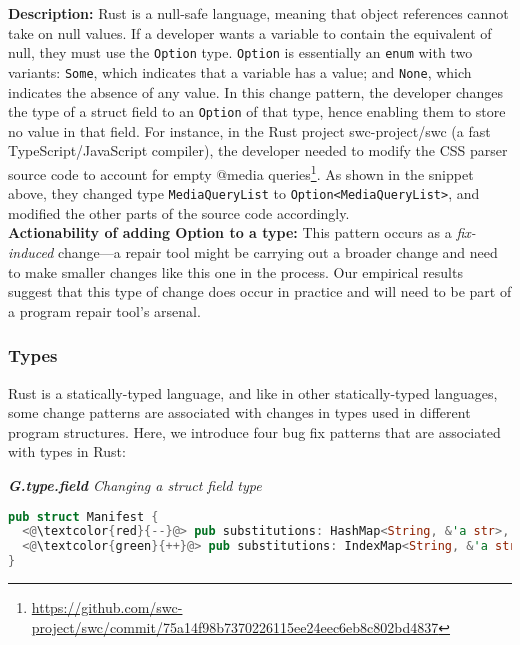 \noindent\textbf{Description:} Rust is a null-safe language, meaning that object references cannot take on null values. If a developer wants a variable to contain the equivalent of null, they must use the \texttt{Option} type. \texttt{Option} is essentially an \texttt{enum} with two variants: \texttt{Some}, which indicates that a variable has a value; and \texttt{None}, which indicates the absence of any value. In this change pattern, the developer changes the type of a struct field to an \texttt{Option} of that type, hence enabling them to store no value in that field. 
For instance, in the Rust project swc-project/swc (a fast TypeScript/JavaScript compiler), the developer needed to modify the CSS parser source code to account for empty @media queries\footnote{\scriptsize \url{https://github.com/swc-project/swc/commit/75a14f98b7370226115ee24eec6eb8c802bd4837}}. As shown in the snippet above, they changed type \texttt{MediaQueryList} to \verb+Option<MediaQueryList>+, and modified the other parts of the source code accordingly. \\

\noindent\textbf{Actionability of adding Option to a type:} This pattern occurs as a \textit{fix-induced} change---a repair tool might be carrying out a broader change and need to make smaller changes like this one in the process. Our empirical results suggest that this type of change does occur in practice and will need to be part of a program repair tool's arsenal.

\subsubsection{Types}

Rust is a statically-typed language, and like in other statically-typed languages, some change patterns are associated with changes in types used in different program structures. Here, we introduce four bug fix patterns that are associated with types in Rust:

\vspace{3mm}

\noindent\textit{\label{sec:G.type.field}\textbf{G.type.field} Changing a struct field type}

\begin{lstlisting}[language=Rust, style=colouredRust]
pub struct Manifest {
  <@\textcolor{red}{--}@> pub substitutions: HashMap<String, &'a str>,
  <@\textcolor{green}{++}@> pub substitutions: IndexMap<String, &'a str>,
}

\end{lstlisting}

